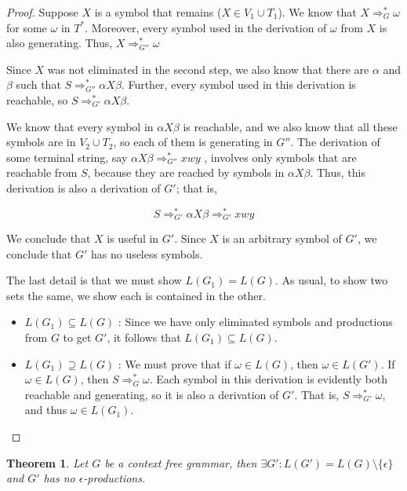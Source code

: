 \documentclass[a4paper,11pt]{article}
\newtheorem{thm}{Theorem}[section]
\begin{document}
\begin{proof}
  Suppose $X$ is a symbol that remains ($X \in V_1 \cup T_1$). We know that $X
  \Rightarrow_G^* \omega$ for some $\omega$ in $T^*$. Moreover, every symbol
  used in the derivation of $\omega$ from $X$ is also generating. Thus, $X
  \Rightarrow_{G''}^* \omega$
  
  Since $X$ was not eliminated in the second step, we also know that there are
  $\alpha$ and $\beta$ such that $S \Rightarrow_{G''}^* \alpha X \beta$.
  Further, every symbol used in this derivation is reachable, so $S
  \Rightarrow_{G'}^* \alpha X \beta$.

  We know that every symbol in $\alpha X \beta$ is reachable, and we also know
  that all these symbols are in $V_2 \cup T_2$, so each of them is generating in
  $G''$. The derivation of some terminal string, say $\alpha X \beta
  \Rightarrow_{G''}^* xwy$ , involves only symbols that are reachable from $S$,
  because they are reached by symbols in $\alpha X \beta$. Thus, this derivation
  is also a derivation of $G'$; that is,

  \[
    S \Rightarrow_{G'}^* \alpha X \beta \Rightarrow_{G'}^* xwy
  \]

  We conclude that $X$ is useful in $G'$. Since $X$ is an arbitrary symbol of
  $G'$, we conclude that $G'$ has no useless symbols.

  The last detail is that we must show $L(G_1) = L (G)$. As usual, to show two
  sets the same, we show each is contained in the other.

  \begin{itemize}
  \item $L(G_1) \subseteq L(G)$ : Since we have only eliminated symbols and
    productions from $G$ to get $G'$, it follows that $L(G_1) \subseteq L(G)$.
  \item $L(G_1) \supseteq L(G)$ : We must prove that if $\omega \in L(G)$, then
    $\omega \in L(G')$. If $\omega \in L(G)$, then $S \Rightarrow_{G}^* \omega$.
    Each symbol in this derivation is evidently both reachable and generating, so
    it is also a derivation of $G'$. That is, $S \Rightarrow_{G'}^* \omega$, and
    thus $\omega \in L(G_1)$.
  \end{itemize}
\end{proof}

\begin{thm}
  Let $G$ be a context free grammar, then $\exists G' : L(G') = L(G) \setminus
  \{\epsilon\}$ and $G'$ has no $\epsilon$-productions.
\end{thm}
\end{document}

